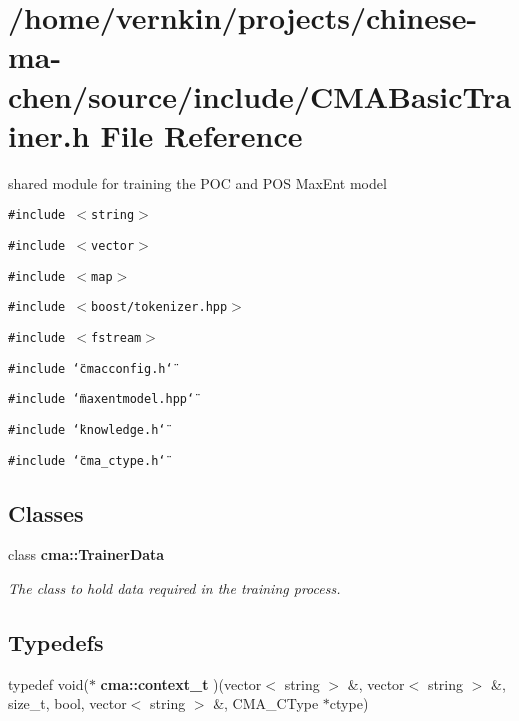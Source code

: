 \section{/home/vernkin/projects/chinese-ma-chen/source/include/CMABasicTrainer.h File Reference}
\label{CMABasicTrainer_8h}
shared module for training the POC and POS MaxEnt model  


{\tt \#include $<$string$>$}\par
{\tt \#include $<$vector$>$}\par
{\tt \#include $<$map$>$}\par
{\tt \#include $<$boost/tokenizer.hpp$>$}\par
{\tt \#include $<$fstream$>$}\par
{\tt \#include \char`\"{}cmacconfig.h\char`\"{}}\par
{\tt \#include \char`\"{}maxentmodel.hpp\char`\"{}}\par
{\tt \#include \char`\"{}knowledge.h\char`\"{}}\par
{\tt \#include \char`\"{}cma\_\-ctype.h\char`\"{}}\par
\subsection*{Classes}
\begin{CompactItemize}
\item 
class {\bf cma::TrainerData}
\begin{CompactList}\small\item\em The class to hold data required in the training process. \item\end{CompactList}\end{CompactItemize}
\subsection*{Typedefs}
\begin{CompactItemize}
\item 
typedef void($\ast$ {\bf cma::context\_\-t} )(vector$<$ string $>$ \&, vector$<$ string $>$ \&, size\_\-t, bool, vector$<$ string $>$ \&, CMA\_\-CType $\ast$ctype)
\end{CompactItemize}
